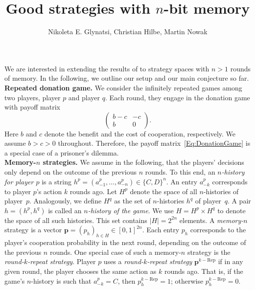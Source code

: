 \documentclass{article}
\title{\vspace{-2cm} Good strategies with $n$-bit memory}
\author{Nikoleta E. Glynatsi, Christian Hilbe, Martin Nowak}
\date{}
\theoremstyle{definition}
\begin{document}
\maketitle

\onehalfspacing

\noindent
We are interested in extending the results of \citep{akin:EGADS:2016} to strategy spaces with $n\!>\!1$ rounds of memory. 
In the following, we outline our setup and our main conjecture so far.\\

\noindent
{\bf Repeated donation game.} We consider the infinitely repeated games among two players, player $p$ and player $q$. 
Each round, they engage in the donation game with payoff matrix
\begin{equation} \label{Eq:DonationGame}
\left(
\begin{array}{cc}
b-c	&-c\\
b	&0
\end{array}
\right).
\end{equation}
Here $b$ and $c$ denote the benefit and the cost of cooperation, respectively. 
We assume $b\!>\!c\!>\!0$ throughout. 
Therefore, the payoff matrix~\eqref{Eq:DonationGame} is a special case of a prisoner's dilemma.\\

\noindent
{\bf Memory-$n$ strategies.} We assume in the following, that the players' decisions only depend on the outcome of the previous $n$ rounds. 
To this end, an {\it $n$-history for player $p$} is a string $h^p=(a^p_{-1},\ldots,a^p_{-n})\!\in\!\{C,D\}^n$. 
An entry $a^p_{-k}$ corresponds to player $p$'s action $k$ rounds ago. 
Let $H^p$ denote the space of all $n$-histories of player~$p$. 
Analogously, we define $H^q$ as the set of $n$-histories $h^q$ of player~$q$. 
A pair $h\!=\!(h^p,h^q)$ is called an {\it $n$-history of the game}. 
We use $H=H^p\times H^q$ to denote the space of all such histories. 
This set contains $|H|=2^{2n}$ elements. 
A {\it memory-$n$} strategy is a vector $\mathbf{p}=(p_h)_{h\in H}\in[0,1]^{2n}$. 
Each entry $p_h$ corresponds to the player's cooperation probability in the next round, depending on the outcome of the previous $n$ rounds. 
One special case of such a memory-$n$ strategy is the  {\it round-$k$-repeat strategy}. 
Player $p$ uses a {\it round-$k$-repeat strategy} $\mathbf{p}^{k-\text{Rep}}$ if in any given round, the player chooses the same action as $k$ rounds ago. That is, if the game's $n$-history is such that $a^p_{-k}\!=\!C$, then $p^{k-\text{Rep}}_h\!=\!1$; otherwise $p^{k-\text{Rep}}_h\!=\!0$.
\end{document}
